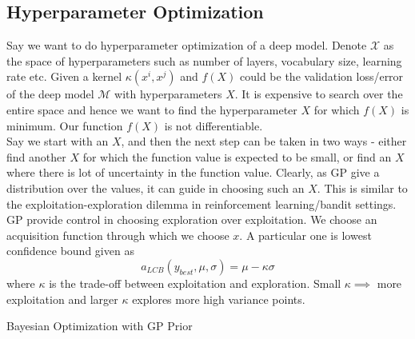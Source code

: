 \subsection{Hyperparameter Optimization}
Say we want to do hyperparameter optimization of a deep model. Denote $\mathcal{X}$ as the space of hyperparameters such as number of layers, vocabulary size, learning rate etc. Given a kernel $\kappa(x^i, x^j)$ and $f(X)$ could be the validation loss/error of the deep model $\mathcal M$ with hyperparameters $X$. It is expensive to search over the entire space and hence we want to find the hyperparameter $X$ for which $f(X)$ is minimum. Our function $f(X)$ is not differentiable. \\
Say we start with an $X$, and then the next step can be taken in two ways - either find another $X$ for which the function value is expected to be small, or find an $X$ where there is lot of uncertainty in the function value. Clearly, as GP give a distribution over the values, it can guide in choosing such an $X$. This is similar to the exploitation-exploration dilemma in reinforcement learning/bandit settings. GP provide control in choosing exploration over exploitation. We choose an acquisition function through which we choose $x$. A particular one is lowest confidence bound given as
\begin{equation}
	a_{LCB}(y_{best}, \mu, \sigma) = \mu - \kappa \sigma
\end{equation}
where $\kappa$ is the trade-off between exploitation and exploration. Small $\kappa \implies $ more exploitation and larger $\kappa$ explores more high variance points.
\begin{algorithm}
\caption{Bayesian Optimization with GP Prior}
\end{algorithm}